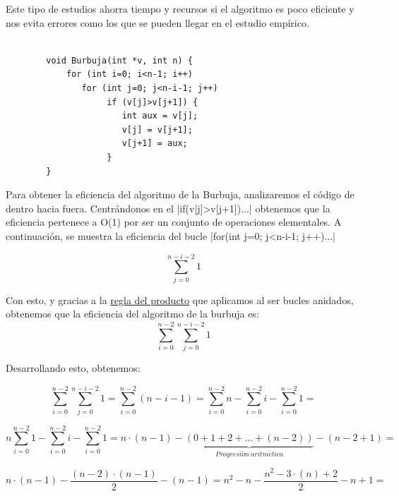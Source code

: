 \documentclass[10pt,a4paper,spanish]{report}
\theoremstyle{definition}
\theoremstyle{remark}
\begin{document}
    Este tipo de estudios ahorra tiempo y recursos si el algoritmo es poco eficiente y nos evita errores como los que se pueden llegar en el estudio empírico.

    \begin{verbatim}

        void Burbuja(int *v, int n) {
            for (int i=0; i<n-1; i++)
               for (int j=0; j<n-i-1; j++)
                    if (v[j]>v[j+1]) {
                       int aux = v[j];
                       v[j] = v[j+1];
                       v[j+1] = aux;
                    }
        }
    \end{verbatim}

    Para obtener la eficiencia del algoritmo de la Burbuja, analizaremos el código de dentro hacia fuera. Centrándonos en el |if(v[j]>v[j+1]){...}| obtenemos que la eficiencia pertenece a O(1) por ser un conjunto de operaciones elementales. A continuación, se muestra la eficiencia del bucle |for(int j=0; j<n-i-1; j++){...}| 

    \begin{displaymath}
        \sum_{j=0}^{n-i-2} 1
    \end{displaymath}

    Con esto, y gracias a la \hyperref[reglas_efic]{regla del producto} que aplicamos al ser bucles anidados, obtenemos que la eficiencia del algoritmo de la burbuja es:
    \begin{displaymath}
        \sum_{i=0}^{n-2}\sum_{j=0}^{n-i-2} 1
    \end{displaymath}

    Desarrollando esto, obtenemos:

    \begin{displaymath}
        \sum_{i=0}^{n-2}\sum_{j=0}^{n-i-2} 1 = \sum_{i=0}^{n-2}(n-i-1) = \sum_{i=0}^{n-2} n - \sum_{i=0}^{n-2} i - \sum_{i=0}^{n-2} 1 = 
    \end{displaymath}

    \begin{displaymath}
        n\sum_{i=0}^{n-2} 1 - \sum_{i=0}^{n-2} i - \sum_{i=0}^{n-2} 1 = n\cdot(n - 1) - \underbrace{(0 + 1 + 2 + ... + (n - 2))}_{Progresi\acute{o}n~aritm\acute{e}tica} - (n - 2 + 1) =
    \end{displaymath}

    \begin{displaymath}
        n\cdot(n-1) - \frac{(n-2)\cdot(n - 1)}{2} - (n - 1) = n^{2} - n - \frac{n^{2} - 3\cdot(n) + 2}{2} - n + 1 = 
    \end{displaymath}
\end{document}
